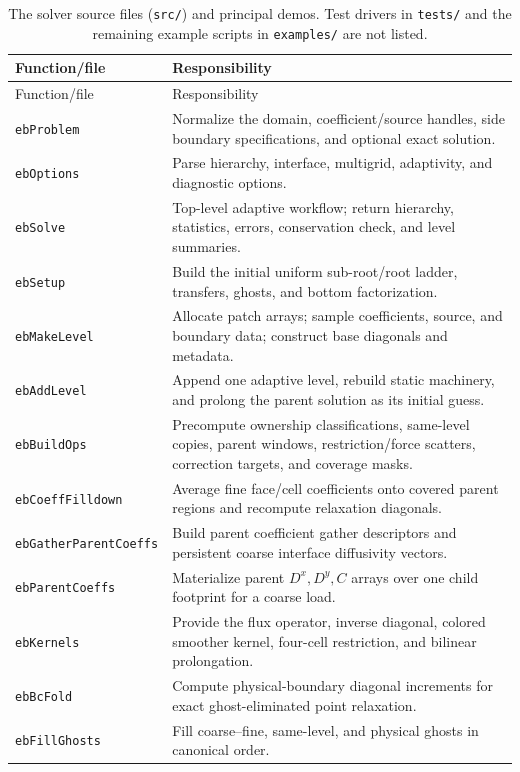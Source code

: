 \documentclass[11pt,oneside,openany]{book}
\newcommand{\code}[1]{\textnormal{\texttt{#1}}}
\begin{document}
\small
\begin{longtable}{@{}p{}p{}@{}}
\caption{The solver source files (\code{src/}) and principal demos. Test drivers in \code{tests/} and the remaining example scripts in \code{examples/} are not listed.}\label{tab:functions}\\
\toprule
Function/file & Responsibility \\
\midrule
\endfirsthead
\toprule
Function/file & Responsibility \\
\midrule
\endhead
\code{ebProblem} & Normalize the domain, coefficient/source handles, side boundary specifications, and optional exact solution. \\
\code{ebOptions} & Parse hierarchy, interface, multigrid, adaptivity, and diagnostic options. \\
\code{ebSolve} & Top-level adaptive workflow; return hierarchy, statistics, errors, conservation check, and level summaries. \\
\code{ebSetup} & Build the initial uniform sub-root/root ladder, transfers, ghosts, and bottom factorization. \\
\code{ebMakeLevel} & Allocate patch arrays; sample coefficients, source, and boundary data; construct base diagonals and metadata. \\
\code{ebAddLevel} & Append one adaptive level, rebuild static machinery, and prolong the parent solution as its initial guess. \\
\code{ebBuildOps} & Precompute ownership classifications, same-level copies, parent windows, restriction/force scatters, correction targets, and coverage masks. \\
\code{ebCoeffFilldown} & Average fine face/cell coefficients onto covered parent regions and recompute relaxation diagonals. \\
\code{ebGatherParentCoeffs} & Build parent coefficient gather descriptors and persistent coarse interface diffusivity vectors. \\
\code{ebParentCoeffs} & Materialize parent $D^x,D^y,C$ arrays over one child footprint for a coarse load. \\
\code{ebKernels} & Provide the flux operator, inverse diagonal, colored smoother kernel, four-cell restriction, and bilinear prolongation. \\
\code{ebBcFold} & Compute physical-boundary diagonal increments for exact ghost-eliminated point relaxation. \\
\code{ebFillGhosts} & Fill coarse--fine, same-level, and physical ghosts in canonical order. \\

\end{longtable}
\end{document}

